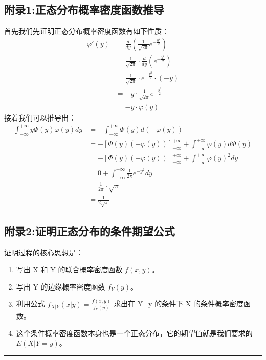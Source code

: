 \documentclass[UTF8]{ctexart}
\begin{document}
\subsection*{附录1:正态分布概率密度函数推导}
首先我们先证明正态分布概率密度函数有如下性质：
$$
\begin{align*}
    \varphi'(y) &= \frac{d}{dy}\left(\frac{1}{\sqrt{2\pi}}e^{-\frac{y^2}{2}}\right) \\
    &= \frac{1}{\sqrt{2\pi}} \cdot \frac{d}{dy}\left(e^{-\frac{y^2}{2}}\right) \\
    &= \frac{1}{\sqrt{2\pi}} \cdot e^{-\frac{y^2}{2}} \cdot \left(-y\right) \\
    &= -y \cdot \frac{1}{\sqrt{2\pi}}e^{-\frac{y^2}{2}} \\
    &= -y \cdot \varphi(y)
\end{align*}
$$
接着我们可以推导出：
$$
\begin{align*}
    \int_{-\infty}^{+\infty} y\Phi(y)\varphi(y)dy
    &= -\int_{-\infty}^{+\infty} \Phi(y)d(-\varphi(y)) \\
    &= -\left[\Phi(y)(-\varphi(y))\right]_{-\infty}^{+\infty} + \int_{-\infty}^{+\infty} \varphi(y)d\Phi(y) \\
    &= -\left[\Phi(y)(-\varphi(y))\right]_{-\infty}^{+\infty} + \int_{-\infty}^{+\infty} \varphi(y)^2 dy \\
    &= 0 + \int_{-\infty}^{+\infty} \frac{1}{2\pi}e^{-y^2} dy \\
    &= \frac{1}{2\pi} \cdot \sqrt{\pi} \\
    &= \frac{1}{2\sqrt{\pi}}
\end{align*}
$$

\subsection*{附录2:证明正态分布的条件期望公式}
\noindent 证明过程的核心思想是：
\begin{enumerate}
    \item 写出 X 和 Y 的联合概率密度函数 $f(x, y)$。
    \item 写出 Y 的边缘概率密度函数 $f_Y(y)$。
    \item 利用公式 $f_{X|Y}(x|y) = \frac{f(x, y)}{f_Y(y)}$ 求出在 Y=y 的条件下 X 的条件概率密度函数。
    \item 这个条件概率密度函数本身也是一个正态分布，它的期望值就是我们要求的 $E(X|Y=y)$。
\end{enumerate}

\hrule
\vspace{1em}
\end{document}
